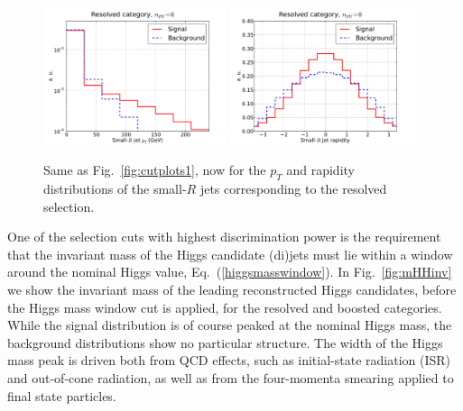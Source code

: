 \begin{figure}[t]
\begin{center}
 \includegraphics[width=0.48\textwidth]{plots/pt_smallRjets_res_noPU.pdf}
 \includegraphics[width=0.48\textwidth]{plots/eta_smallRjets_res_noPU.pdf}
 \caption{\small Same as Fig.~\ref{fig:cutplots1}, now for the
   $p_T$ and rapidity distributions of the small-$R$
   jets corresponding to the resolved selection.
}
\label{fig:cutplots23}
\end{center}
\end{figure}

One of the selection cuts with highest discrimination power is the requirement
that the invariant mass of the Higgs candidate (di)jets must lie within a window
around the nominal Higgs value, Eq.~(\ref{higgsmasswindow}).
%
In Fig.~\ref{fig:mHHinv} we show the invariant mass
of the leading reconstructed Higgs candidates, before the Higgs mass window
cut 
  is applied, for the resolved and boosted categories.
%
While the signal distribution is of course peaked at the
nominal Higgs mass, the background distributions
show no particular
structure.
%
The
width of the Higgs mass peak is driven both from QCD effects,
such as initial-state radiation (ISR)
and out-of-cone radiation, as well
as from the four-momenta smearing applied to final state particles.
%

